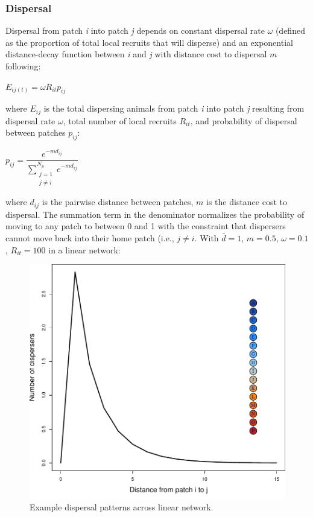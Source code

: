 \documentclass[]{article}
\begin{document}
\hypertarget{dispersal}{%
\subsubsection{Dispersal}\label{dispersal}}

Dispersal from patch \emph{i} into patch \emph{j} depends on constant
dispersal rate \(\omega\) (defined as the proportion of total local
recruits that will disperse) and an exponential distance-decay function
between \emph{i} and \emph{j} with distance cost to dispersal \(m\)
following:

\(E_{ij(t)}=\omega R_{it}p_{ij}\)

where \(E_{ij}\) is the total dispersing animals from patch \emph{i}
into patch \emph{j} resulting from dispersal rate \(\omega\), total
number of local recruits \(R_{it}\), and probability of dispersal
between patches \(p_{ij}\):

\(p_{ij}=\dfrac{e^{-md_{ij}}}{\sum\limits_{\substack{j=1 \\ j\neq i}}^{N_p} e^{-md_{ij}}}\)

where \(d_{ij}\) is the pairwise distance between patches, \(m\) is the
distance cost to dispersal. The summation term in the denominator
normalizes the probability of moving to any patch to between 0 and 1
with the constraint that dispersers cannot move back into their home
patch (i.e., \(j\neq i\). With \(\bar{d}= 1\), \(m=0.5\),
\(\omega=0.1\), \(R_{it}=100\) in a linear network:

\begin{figure}[H]

{\centering \includegraphics{Managing_for_ecological_surprises_in_metapopulations_makeHTML_files/figure-latex/dispersal-1} 

}

\caption{Example dispersal patterns across linear network.}\label{fig:dispersal}
\end{figure}
\end{document}

